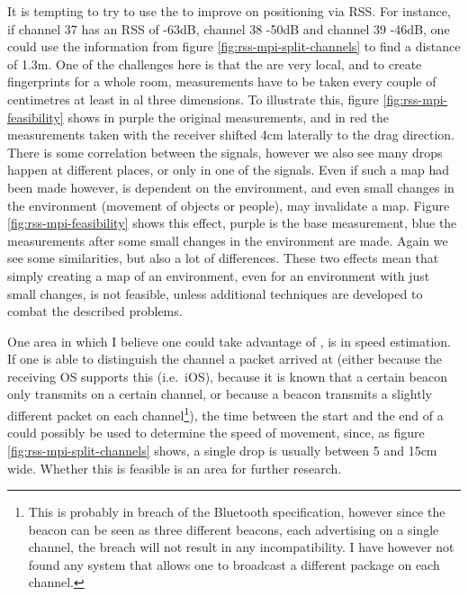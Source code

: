 
It is tempting to try to use the \mpids to improve on positioning via RSS.
For instance, if channel 37 has an RSS of -63dB, channel 38 -50dB and channel 39 -46dB, one could use the information from figure \ref{fig:rss-mpi-split-channels} to find a distance of 1.3m.
One of the challenges here is that the \mpids are very local, and to create fingerprints for a whole room, measurements have to be taken every couple of centimetres at least in al three dimensions.
To illustrate this, figure \ref{fig:rss-mpi-feasibility} shows in purple the original measurements, and in red the measurements taken with the receiver shifted 4cm laterally to the drag direction.
There is some correlation between the signals, however we also see many drops happen at different places, or only in one of the signals.
Even if such a map had been made however, \mpi is dependent on the environment, and even small changes in the environment (movement of objects or people), may invalidate a map.
Figure \ref{fig:rss-mpi-feasibility} shows this effect, purple is the base measurement, blue the measurements after some small changes in the environment are made.
Again we see some similarities, but also a lot of differences.
These two effects mean that simply creating a map of an environment, even for an environment with just small changes, is not feasible, unless additional techniques are developed to combat the described problems.

One area in which I believe one could take advantage of \mpi, is in speed estimation.
If one is able to distinguish the channel a packet arrived at (either because the receiving OS supports this (i.e.\ iOS), because it is known that a certain beacon only transmits on a certain channel, or because a beacon transmits a slightly different packet on each channel\footnote{This is probably in breach of the Bluetooth specification, however since the beacon can be seen as three different beacons, each advertising on a single channel, the breach will not result in any incompatibility. I have however not found any system that allows one to broadcast a different package on each channel.}), the time between the start and the end of a \mpid could possibly be used to determine the speed of movement, since, as figure \ref{fig:rss-mpi-split-channels} shows, a single drop is usually between 5 and 15cm wide.
Whether this is feasible is an area for further research.


